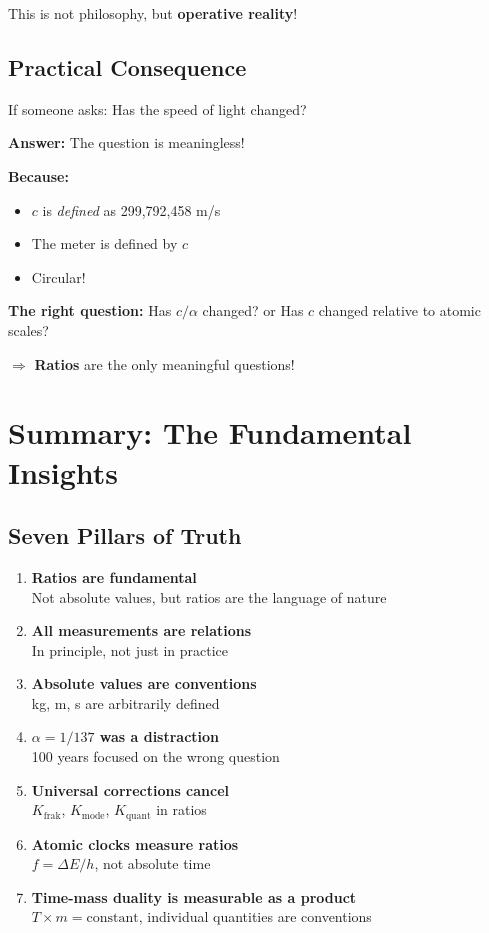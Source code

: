 This is not philosophy, but \textbf{operative reality}!

\subsection{Practical Consequence}

If someone asks: Has the speed of light changed?

\textbf{Answer:} The question is meaningless!

\textbf{Because:}
\begin{itemize}[nosep]
	\item $c$ is \textit{defined} as 299,792,458 m/s
	\item The meter is defined by $c$
	\item Circular!
\end{itemize}

\textbf{The right question:} Has $c/\alpha$ changed? or Has $c$ changed relative to atomic scales?

$\Rightarrow$ \textbf{Ratios} are the only meaningful questions!

\section{Summary: The Fundamental Insights}

\subsection{Seven Pillars of Truth}

\begin{enumerate}
	\item \textbf{Ratios are fundamental} \\
	Not absolute values, but ratios are the language of nature
	
	\item \textbf{All measurements are relations} \\
	In principle, not just in practice
	
	\item \textbf{Absolute values are conventions} \\
	kg, m, s are arbitrarily defined
	
	\item \textbf{$\alpha = 1/137$ was a distraction} \\
	100 years focused on the wrong question
	
	\item \textbf{Universal corrections cancel} \\
	$K_\text{frak}$, $K_\text{mode}$, $K_\text{quant}$ in ratios
	
	\item \textbf{Atomic clocks measure ratios} \\
	$f = \Delta E / h$, not absolute time
	
	\item \textbf{Time-mass duality is measurable as a product} \\
	$T \times m = \text{constant}$, individual quantities are conventions
\end{enumerate}

